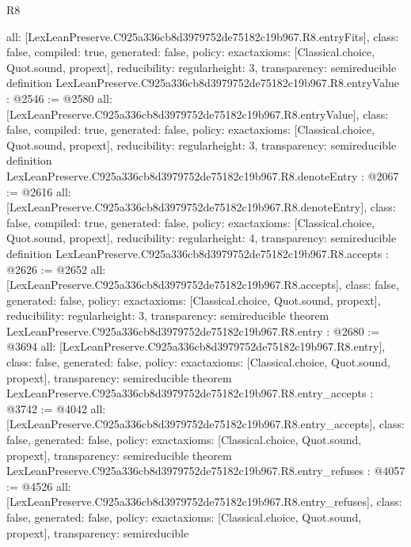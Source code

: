 \begin{lexlean}{R8}
\begin{coremodule}
{  all: [LexLeanPreserve.C925a336cb8d3979752de75182c19b967.R8.entryFits],
  class: false,
  compiled: true,
  generated: false,
  policy: exact{axioms: [Classical.choice, Quot.sound, propext]},
  reducibility: regular{height: 3},
  transparency: semireducible
}
definition LexLeanPreserve.C925a336cb8d3979752de75182c19b967.R8.entryValue : @2546 := @2580 {
  all: [LexLeanPreserve.C925a336cb8d3979752de75182c19b967.R8.entryValue],
  class: false,
  compiled: true,
  generated: false,
  policy: exact{axioms: [Classical.choice, Quot.sound, propext]},
  reducibility: regular{height: 3},
  transparency: semireducible
}
definition LexLeanPreserve.C925a336cb8d3979752de75182c19b967.R8.denoteEntry : @2067 := @2616 {
  all: [LexLeanPreserve.C925a336cb8d3979752de75182c19b967.R8.denoteEntry],
  class: false,
  compiled: true,
  generated: false,
  policy: exact{axioms: [Classical.choice, Quot.sound, propext]},
  reducibility: regular{height: 4},
  transparency: semireducible
}
definition LexLeanPreserve.C925a336cb8d3979752de75182c19b967.R8.accepts : @2626 := @2652 {
  all: [LexLeanPreserve.C925a336cb8d3979752de75182c19b967.R8.accepts],
  class: false,
  generated: false,
  policy: exact{axioms: [Classical.choice, Quot.sound, propext]},
  reducibility: regular{height: 3},
  transparency: semireducible
}
theorem LexLeanPreserve.C925a336cb8d3979752de75182c19b967.R8.entry : @2680 := @3694 {
  all: [LexLeanPreserve.C925a336cb8d3979752de75182c19b967.R8.entry],
  class: false,
  generated: false,
  policy: exact{axioms: [Classical.choice, Quot.sound, propext]},
  transparency: semireducible
}
theorem LexLeanPreserve.C925a336cb8d3979752de75182c19b967.R8.entry_accepts : @3742 := @4042 {
  all: [LexLeanPreserve.C925a336cb8d3979752de75182c19b967.R8.entry_accepts],
  class: false,
  generated: false,
  policy: exact{axioms: [Classical.choice, Quot.sound, propext]},
  transparency: semireducible
}
theorem LexLeanPreserve.C925a336cb8d3979752de75182c19b967.R8.entry_refuses : @4057 := @4526 {
  all: [LexLeanPreserve.C925a336cb8d3979752de75182c19b967.R8.entry_refuses],
  class: false,
  generated: false,
  policy: exact{axioms: [Classical.choice, Quot.sound, propext]},
  transparency: semireducible
}


\end{coremodule}
\end{lexlean}
